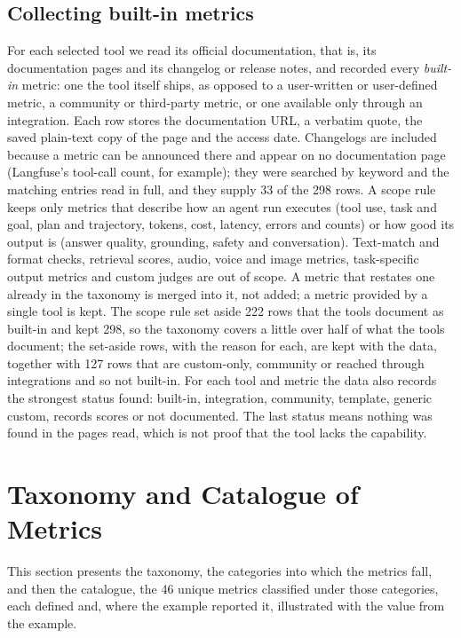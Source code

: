 \documentclass[conference]{IEEEtran}
\begin{document}
\subsection{Collecting built-in metrics}\label{sec:collection}
For each selected tool we read its official documentation, that is, its documentation pages and its changelog or release notes, and recorded every \emph{built-in} metric: one the tool itself ships, as opposed to a user-written or user-defined metric, a community or third-party metric, or one available only through an integration. Each row stores the documentation URL, a verbatim quote, the saved plain-text copy of the page and the access date. Changelogs are included because a metric can be announced there and appear on no documentation page (Langfuse's tool-call count, for example); they were searched by keyword and the matching entries read in full, and they supply 33 of the 298 rows.
A scope rule keeps only metrics that describe how an agent run executes (tool use, task and goal, plan and trajectory, tokens, cost, latency, errors and counts) or how good its output is (answer quality, grounding, safety and conversation). Text-match and format checks, retrieval scores, audio, voice and image metrics, task-specific output metrics and custom judges are out of scope. A metric that restates one already in the taxonomy is merged into it, not added; a metric provided by a single tool is kept. The scope rule set aside 222 rows that the tools document as built-in and kept 298, so the taxonomy covers a little over half of what the tools document; the set-aside rows, with the reason for each, are kept with the data, together with 127 rows that are custom-only, community or reached through integrations and so not built-in.
For each tool and metric the data also records the strongest status found: built-in, integration, community, template, generic custom, records scores or not documented. The last status means nothing was found in the pages read, which is not proof that the tool lacks the capability.

\FloatBarrier
\section{Taxonomy and Catalogue of Metrics}\label{sec:catalogue}
This section presents the taxonomy, the categories into which the metrics fall, and then the catalogue, the 46 unique metrics classified under those categories, each defined and, where the example reported it, illustrated with the value from the example.
\end{document}
